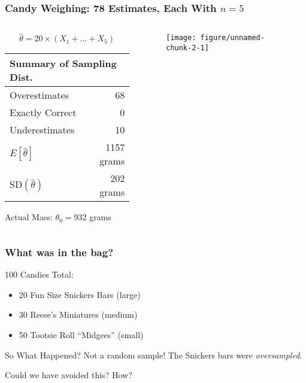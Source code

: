 \documentclass[handout]{beamer}
\makeatletter
\def\maxwidth{ %
  \ifdim\Gin@nat@width>\linewidth
    \linewidth
  \else
    \Gin@nat@width
  \fi
}
\newenvironment{knitrout}{}{} %
\makeatother
\begin{document}
\begin{frame}[fragile]



\frametitle{Candy Weighing: 78 Estimates, Each With $n=5$}

\begin{columns} 
\begin{column}[c]{5cm} 
\small

$$\widehat{\theta} = 20 \times (X_1 + \hdots + X_5)$$

\small
   \begin{tabular}{lr}
   \hline \hline
   \multicolumn{2}{l}{Summary of Sampling Dist.} \\
   \hline
   Overestimates& 68\\
   Exactly Correct& 0\\
   Underestimates& 10\\
   \hline
   $E[\hat{\theta}]$& 1157 grams\\
   SD$(\widehat{\theta})$& 202 grams\\
   \hline
   \end{tabular}
   
  \vspace{1em}
  Actual Mass:  $\theta_0 =$932 grams
\end{column} 
\begin{column}[c]{5cm} 

\begin{figure}
\centering
\begin{knitrout}
\color{fgcolor}

{\centering \texttt{[image: figure/unnamed-chunk-2-1]} 

}



\end{knitrout}


\end{figure}

\end{column} 
\end{columns} 


\end{frame}

\begin{frame}
\frametitle{What was in the bag?}

100 Candies Total:
\begin{itemize}
	\item 20 Fun Size Snickers Bars (large) 
	\item 30 Reese's Miniatures (medium) 
	\item 50 Tootsie Roll ``Midgees'' (small)
\end{itemize}
\begin{block}{So What Happened?}
	\pause Not a random sample! The Snickers bars were \emph{oversampled}.
\end{block}
\begin{block}{Could we have avoided this? How?}

\end{block}
\end{frame}
\end{document}
